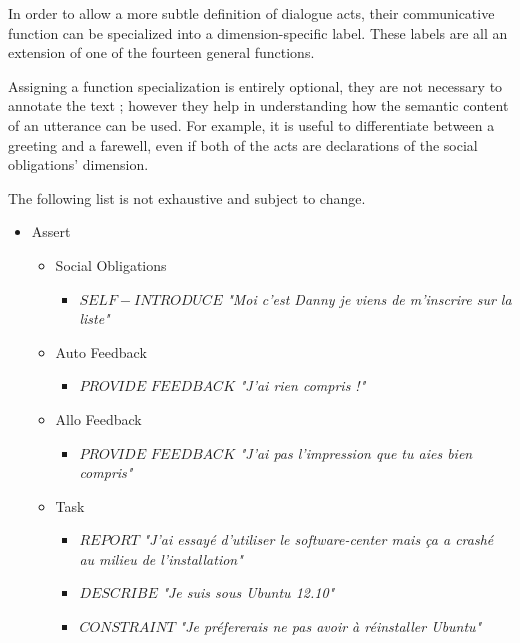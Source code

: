 In order to allow a more subtle definition of dialogue acts, their communicative function can be specialized into a dimension-specific label. These labels are all an extension of one of the fourteen general functions.

Assigning a function specialization is entirely optional, they are not necessary to annotate the text ; however they help in understanding how the semantic content of an utterance can be used. For example, it is useful to differentiate between a greeting and a farewell, even if both of the acts are declarations of the social obligations' dimension.

The following list is not exhaustive and subject to change.

\begin{itemize}
	\item Assert
		\begin{itemize}
			\item Social Obligations
				\begin{itemize}
					\item $SELF-INTRODUCE$
						\newline \textit{"Moi c'est Danny je viens de m'inscrire sur la liste"}
				\end{itemize}
			\item Auto Feedback
				\begin{itemize}
					\item $PROVIDE$ $FEEDBACK$
						\newline \textit{"J'ai rien compris !"}
				\end{itemize}
			\item Allo Feedback
				\begin{itemize}
					\item $PROVIDE$ $FEEDBACK$
						\newline \textit{"J'ai pas l'impression que tu aies bien compris"}
				\end{itemize}
			\item Task
				\begin{itemize}
					\item $REPORT$
						\newline \textit{"J'ai essayé d'utiliser le software-center mais ça a crashé au milieu de l'installation"}
					\item $DESCRIBE$
						\newline \textit{"Je suis sous Ubuntu 12.10"}
					\item $CONSTRAINT$
						\newline \textit{"Je préfererais ne pas avoir à réinstaller Ubuntu"}

\end{itemize}
\end{itemize}
\end{itemize}
